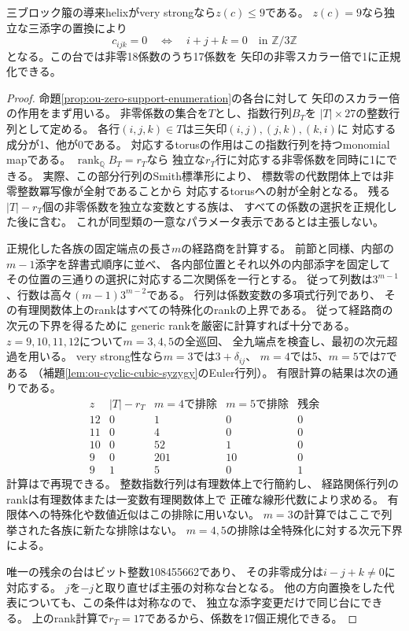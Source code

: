 \begin{theorem}
\label{thm:ou-large-zero-path-exclusion}
三ブロック箙の導来helixがvery strongなら$z(c)\leq9$である。
$z(c)=9$なら独立な三添字の置換により
\[
 c_{ijk}=0\quad\Longleftrightarrow\quad i+j+k=0
 \quad\text{in }\mathbb Z/3\mathbb Z
\]
となる。この台では非零18係数のうち17係数を
矢印の非零スカラー倍で1に正規化できる。
\end{theorem}
\begin{proof}
命題\ref{prop:ou-zero-support-enumeration}の各台に対して
矢印のスカラー倍の作用をまず用いる。
非零係数の集合を$T$とし、指数行列$B_T$を
$|T|\times27$の整数行列として定める。
各行$(i,j,k)\in T$は三矢印$(i,j),(j,k),(k,i)$に
対応する成分が1、他が0である。
対応するtorusの作用はこの指数行列を持つmonomial mapである。
$\operatorname{rank}_{\mathbb Q}B_T=r_T$なら
独立な$r_T$行に対応する非零係数を同時に1にできる。
実際、この部分行列のSmith標準形により、
標数零の代数閉体上では非零整数冪写像が全射であることから
対応するtorusへの射が全射となる。
残る$|T|-r_T$個の非零係数を独立な変数とする族は、
すべての係数の選択を正規化した後に含む。
これが同型類の一意なパラメータ表示であるとは主張しない。

正規化した各族の固定端点の長さ$m$の経路商を計算する。
前節と同様、内部の$m-1$添字を辞書式順序に並べ、
各内部位置とそれ以外の内部添字を固定して
その位置の三通りの選択に対応する二次関係を一行とする。
従って列数は$3^{m-1}$、行数は高々$(m-1)3^{m-2}$である。
行列は係数変数の多項式行列であり、
その有理関数体上のrankはすべての特殊化のrankの上界である。
従って経路商の次元の下界を得るために
generic rankを厳密に計算すれば十分である。
$z=9,10,11,12$について$m=3,4,5$の全巡回、
全九端点を検査し、最初の次元超過を用いる。
very strong性なら$m=3$では$3+\delta_{ij}$、
$m=4$では5、$m=5$では7である
（補題\ref{lem:ou-cyclic-cubic-syzygy}のEuler行列）。
有限計算の結果は次の通りである。
\[
\begin{array}{r|r|r|r|r}
 z & |T|-r_T & m=4\text{で排除} & m=5\text{で排除}
 & \text{残余}\\ \hline
12&0&1&0&0\\
11&0&4&0&0\\
10&0&52&1&0\\
9&0&201&10&0\\
9&1&5&0&1
\end{array}
\]
計算はで再現できる。
整数指数行列は有理数体上で行簡約し、
経路関係行列のrankは有理数体または一変数有理関数体上で
正確な線形代数により求める。
有限体への特殊化や数値近似はこの排除に用いない。
$m=3$の計算ではここで列挙された各族に新たな排除はない。
$m=4,5$の排除は全特殊化に対する次元下界による。

唯一の残余の台はビット整数108455662であり、
その非零成分は$i-j+k\ne0$に対応する。
$j$を$-j$と取り直せば主張の対称な台となる。
他の方向置換をした代表についても、この条件は対称なので、
独立な添字変更だけで同じ台にできる。
上のrank計算で$r_T=17$であるから、係数を17個正規化できる。
\end{proof}

